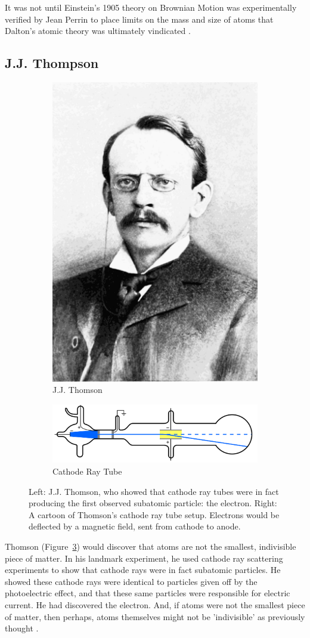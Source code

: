 It was not until Einstein's 1905 theory on Brownian Motion was experimentally
verified by Jean Perrin to place limits on the mass and size of atoms that
Dalton's atomic theory was ultimately vindicated \cite{Patterson200750}.

\subsection{J.J. Thompson}

\begin{figure}[ht]
	\centering
	\begin{subfigure}{.4\textwidth}
		\centering
		\includegraphics[width=0.4\linewidth]{./figures/jjthomson.png}
		\caption{J.J. Thomson  \cite{PopularScience1899}}
		\label{fig:thomsonportrait}
	\end{subfigure}%
	\begin{subfigure}{0.6\textwidth}
		\centering
		\includegraphics[width=0.4\linewidth]{./figures/cathoderaytube.png}
		\caption{Cathode Ray Tube  \cite{Kurzon2010}}
		\label{fig:thomsoncathode}
	\end{subfigure}
	\caption{ 
		Left: J.J. Thomson, who showed that cathode ray tubes were in fact producing
		the first observed subatomic particle: the electron. Right: A cartoon of
		Thomson's cathode ray tube setup. Electrons would be deflected by a magnetic
		field, sent from cathode to anode.
	}
	\label{fig:jjthomson}
\end{figure}

Thomson (Figure~\ref{fig:jjthomson}) would discover that atoms are not the
smallest, indivisible piece of matter. In his landmark experiment, he used
cathode ray scattering experiments to show that cathode rays were in fact
subatomic particles. He showed these cathode rays were identical to particles
given off by the photoelectric effect, and that these same particles were
responsible for electric current. He had discovered the electron. And, if atoms
were not the smallest piece of matter, then perhaps, atoms themselves might not
be 'indivisible' as previously thought \cite{nobelthomson2014}.

